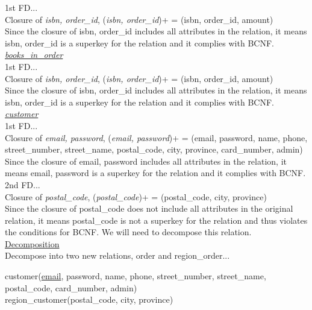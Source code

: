 \documentclass[a4 paper]{article}
\begin{document}
\noindent 1st FD...\\
\indent Closure of \emph{isbn, order\_id}, (\emph{isbn, order\_id})+ = (isbn, order\_id, amount)\\
\indent Since the closure of isbn, order\_id includes all attributes in the relation, it means isbn, order\_id is a superkey for the relation and it complies with BCNF.\\

\noindent\underline{\emph{books\_in\_order}}\\

\noindent 1st FD...\\
\indent Closure of \emph{isbn, order\_id}, (\emph{isbn, order\_id})+ = (isbn, order\_id, amount)\\
\indent Since the closure of isbn, order\_id includes all attributes in the relation, it means isbn, order\_id is a superkey for the relation and it complies with BCNF.\\

\noindent\underline{\emph{customer}}\\

\noindent 1st FD...\\
\indent Closure of \emph{email, password}, (\emph{email, password})+ = (email, password, name, phone, street\_number, street\_name, postal\_code, city, province, card\_number, admin)\\
\indent Since the closure of email, password includes all attributes in the relation, it means email, password is a superkey for the relation and it complies with BCNF.\\

\noindent 2nd FD...\\
\indent Closure of \emph{postal\_code}, (\emph{postal\_code})+ = (postal\_code, city, province)\\
\indent Since the closure of postal\_code does not include all attributes in the original relation, it means postal\_code is not a superkey for the relation and thus violates the conditions for BCNF. We will need to decompose this relation.\\

\noindent\underline{Decomposition}\\
Decompose into two new relations, order and region\_order...

customer(\underline{email}, password, name, phone, street\_number, street\_name, postal\_code, card\_number, admin)\\
\indent region\_customer(postal\_code, city, province)\\
\end{document}
